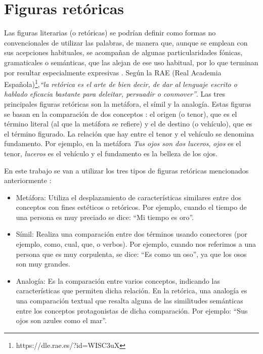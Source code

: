 


\section{Figuras retóricas}
\label{cap:sec:figurasretoricas}

Las figuras literarias (o retóricas) se podrían definir como formas no convencionales de utilizar las palabras, de manera que, aunque se emplean con sus acepciones habituales, se acompañan de algunas particularidades fónicas, gramaticales o semánticas, que las alejan de ese uso habitual, por lo que terminan por resultar especialmente expresivas \citep{GalianaYCasas1994}. 
Según la RAE (Real Academia Española)\footnote{https://dle.rae.es/?id=WISC3uX},\textit{``la retórica es el arte de bien decir, de dar al lenguaje escrito o hablado eficacia bastante para deleitar, persuadir o conmover''}.
Las tres principales figuras retóricas son la metáfora, el símil y la analogía. Estas figuras se basan en la comparación de dos conceptos  \citep{GalianaYCasas1994}: el origen (o tenor), que es el término literal (al que la metáfora se refiere) y el de destino (o vehículo), que es el término figurado. La relación que hay entre el tenor y el vehículo se denomina fundamento. Por ejemplo, en la metáfora \textit{Tus ojos son dos luceros}, \textit{ojos} es el tenor, \textit{luceros} es el vehículo y el fundamento es la belleza de los ojos.


En este trabajo se van a utilizar los tres tipos de figuras retóricas mencionados anteriormente \citep{TFMPaloma}: 
\begin{itemize}
	\item Metáfora: Utiliza el desplazamiento de características similares entre dos conceptos con fines estéticos o retóricos. Por ejemplo, cuando el tiempo de una persona es muy preciado se dice: ``Mi tiempo es oro''.
	
	\item Símil: Realiza una comparación entre dos términos usando conectores (por ejemplo, como, cual, que, o verbos).
	Por ejemplo, cuando nos referimos a una persona que es muy corpulenta, se dice: ``Es como un oso'', ya que los osos son muy grandes.
	
	\item Analogía: Es la comparación entre varios conceptos, indicando las características que permiten dicha relación. En la retórica, una analogía es una comparación textual que resalta alguna de las similitudes semánticas entre los conceptos protagonistas de dicha comparación. Por ejemplo: ``Sus ojos son azules como el mar''.
	
\end{itemize}

